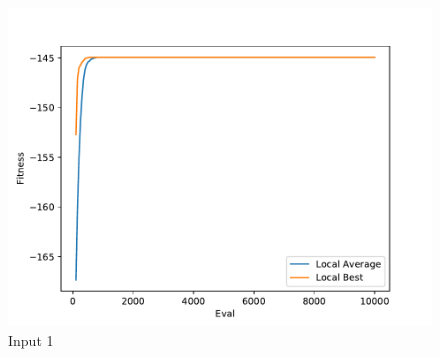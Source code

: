 \documentclass{standalone}
\begin{document}
\begin{figure}[!htb]
	\caption{Input 1}
	\label{fig:graph_1041}
	\includegraphics[width=\textwidth]{../graphs/graphs/1041.pdf}
\end{figure}
\end{document}
